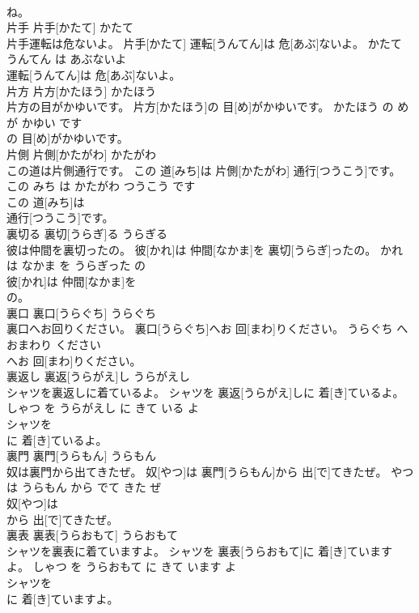\documentclass[8pt]{extreport}
\begin{document}
\begin{CJK}{UTF8}{min}
\\	ね。			
\\	片手	片手[かたて]	かたて	
\\	片手運転は危ないよ。	片手[かたて] 運転[うんてん]は 危[あぶ]ないよ。	かたて うんてん は あぶないよ	
\\	運転[うんてん]は 危[あぶ]ないよ。			
\\	片方	片方[かたほう]	かたほう	
\\	片方の目がかゆいです。	片方[かたほう]の 目[め]がかゆいです。	かたほう の め が かゆい です	
\\	の 目[め]がかゆいです。			
\\	片側	片側[かたがわ]	かたがわ	
\\	この道は片側通行です。	この 道[みち]は 片側[かたがわ] 通行[つうこう]です。	この みち は かたがわ つうこう です	
\\	この 道[みち]は
\\	通行[つうこう]です。			
\\	裏切る	裏切[うらぎ]る	うらぎる	
\\	彼は仲間を裏切ったの。	彼[かれ]は 仲間[なかま]を 裏切[うらぎ]ったの。	かれ は なかま を うらぎった の	
\\	彼[かれ]は 仲間[なかま]を
\\	の。			
\\	裏口	裏口[うらぐち]	うらぐち	
\\	裏口へお回りください。	裏口[うらぐち]へお 回[まわ]りください。	うらぐち へ おまわり ください	
\\	へお 回[まわ]りください。			
\\	裏返し	裏返[うらがえ]し	うらがえし	
\\	シャツを裏返しに着ているよ。	シャツを 裏返[うらがえ]しに 着[き]ているよ。	しゃつ を うらがえし に きて いる よ	
\\	シャツを
\\	に 着[き]ているよ。			
\\	裏門	裏門[うらもん]	うらもん	
\\	奴は裏門から出てきたぜ。	奴[やつ]は 裏門[うらもん]から 出[で]てきたぜ。	やつ は うらもん から でて きた ぜ	
\\	奴[やつ]は
\\	から 出[で]てきたぜ。			
\\	裏表	裏表[うらおもて]	うらおもて	
\\	シャツを裏表に着ていますよ。	シャツを 裏表[うらおもて]に 着[き]ていますよ。	しゃつ を うらおもて に きて います よ	
\\	シャツを
\\	に 着[き]ていますよ。			

\end{CJK}
\end{document}
